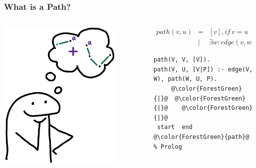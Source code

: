 \documentclass[xcolor={dvipsnames}, aspectratio=169]{beamer}
\begin{document}
\begin{frame}[fragile]
  \frametitle{What is a Path?}
  \begin{columns}    
    \begin{column}{0.35\textwidth}
      \centering
      \includegraphics[width=0.8\textwidth]{pic/pathIs.jpg}
    \end{column}
    \begin{column}{0.75\textwidth} 
\[
\begin{array}{rcl}
  path(v, u) &=& [v], if \, v = u \\ 
             &|& \exists w: edge(v, w) \wedge path(w, u)
\end{array}
\]

\pause 

\begin{center}
  \begin{minipage}{0.82\textwidth}
    \begin{lstlisting}[language=logic,escapechar=@]
path(V, V, [V]). 
path(V, U, [V|P]) :- edge(V, W), path(W, U, P).
     @\color{ForestGreen}{|}@  @\color{ForestGreen}{|}@    @\color{ForestGreen}{|}@
 start  end  @\color{ForestGreen}{path}@                      % Prolog
    \end{lstlisting}
  \end{minipage}  
\end{center}
    \end{column}
    \end{columns}
\end{frame}
\end{document}
